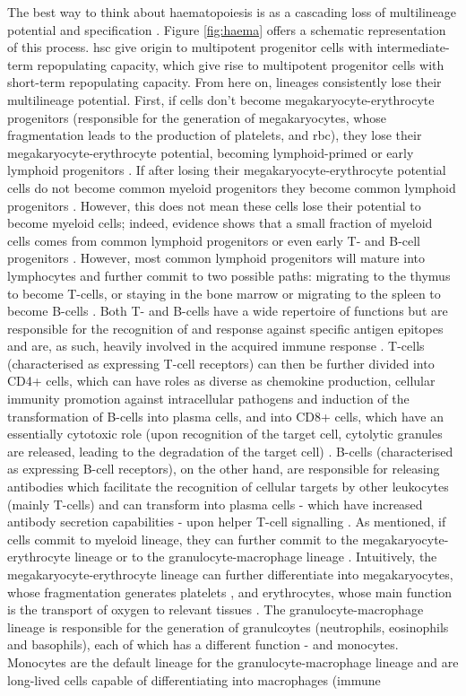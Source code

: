 The best way to think about haematopoiesis is as a cascading loss of multilineage potential and specification \cite{Rieger2012-bh}. Figure \ref{fig:haema} offers a schematic representation of this process. \ac{hsc} give origin to multipotent progenitor cells with intermediate-term repopulating capacity, which give rise to multipotent progenitor cells with short-term repopulating capacity. From here on, lineages consistently lose their multilineage potential. First, if cells don’t become megakaryocyte-erythrocyte progenitors (responsible for the generation of megakaryocytes, whose fragmentation leads to the production of platelets, and \ac{rbc}), they lose their megakaryocyte-erythrocyte potential, becoming lymphoid-primed or early lymphoid progenitors \cite{Adolfsson2005-iq}. If after losing their megakaryocyte-erythrocyte potential cells do not become common myeloid progenitors they become common lymphoid progenitors \cite{Kondo1997-fb}. However, this does not mean these cells lose their potential to become myeloid cells; indeed, evidence shows that a small fraction of myeloid cells comes from common lymphoid progenitors or even early T- and B-cell progenitors \cite{Schlenner2010-ga,Kawamoto2010-yp}. However, most common lymphoid progenitors will mature into lymphocytes and further commit to two possible paths: migrating to the thymus to become T-cells, or staying in the bone marrow or migrating to the spleen to become B-cells \cite{Inlay2009-as}. Both T- and B-cells have a wide repertoire of functions but are responsible for the recognition of and response against specific antigen epitopes and are, as such, heavily involved in the acquired immune response \cite{Cano2013-gu}. T-cells (characterised as expressing T-cell receptors) can then be further divided into CD4+ cells, which can have roles as diverse as chemokine production, cellular immunity promotion against intracellular pathogens and induction of the transformation of B-cells into plasma cells, and into CD8+ cells, which have an essentially cytotoxic role (upon recognition of the target cell, cytolytic granules are released, leading to the degradation of the target cell) \cite{Cano2013-gu}. B-cells (characterised as expressing B-cell receptors), on the other hand, are responsible for releasing antibodies which facilitate the recognition of cellular targets by other leukocytes (mainly T-cells) and can transform into plasma cells - which have increased antibody secretion capabilities - upon helper T-cell signalling \cite{Cano2013-gu,Janeway2001-mb}. As mentioned, if cells commit to myeloid lineage, they can further commit to the megakaryocyte-erythrocyte lineage or to the granulocyte-macrophage lineage \cite{Akashi2000-ck}. Intuitively, the megakaryocyte-erythrocyte lineage can further differentiate into megakaryocytes, whose fragmentation generates platelets \cite{Wright1906-af}, and erythrocytes, whose main function is the transport of oxygen to relevant tissues \cite{Jensen2009-be}. The granulocyte-macrophage lineage is responsible for the generation of granulcoytes (neutrophils, eosinophils and basophils), each of which has a different function - and monocytes. Monocytes are the default lineage for the granulocyte-macrophage lineage and are long-lived cells capable of differentiating into macrophages (immune 